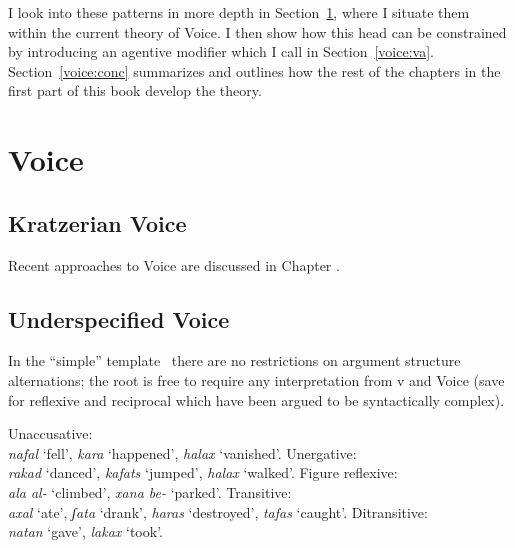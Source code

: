 I look into these patterns in more depth in Section~\ref{voice:voice}, where I situate them within the current theory of Voice. I then show how this head can be constrained by introducing an agentive modifier which I call {\va} in Section~\ref{voice:va}. Section~\ref{voice:conc} summarizes and outlines how the rest of the chapters in the first part of this book develop the theory.

\section{Voice} \label{voice:voice}
	\subsection{Kratzerian Voice}
	
	
Recent approaches to Voice are discussed in Chapter \label{chap:aas}.

	\subsection{Underspecified Voice}


In the ``simple'' template \tkal~there are no restrictions on argument structure alternations; the root is free to require any interpretation from v and Voice (save for reflexive and reciprocal which have been argued to be syntactically complex).

    \begin{minipage}[t]{0.5\textwidth}
    \pex
        \a Unaccusative:\\ \emph{nafal} `fell', \emph{kara} `happened', \emph{halax} `vanished'.
        \a Unergative:\\ \emph{rakad} `danced', \emph{kafats} `jumped', \emph{halax} `walked'.
        \a Figure reflexive:\\ \emph{ala al-} `climbed', \emph{xana be-} `parked'.
        \a Transitive:\\ \emph{axal} `ate', \emph{ʃata} `drank', \emph{haras} `destroyed', \emph{tafas} `caught'.
        \a Ditransitive:\\ \emph{natan} `gave', \emph{lakax} `took'.
    \xe
\end{minipage}
\begin{minipage}[t]{0.05\textwidth}
    \phantom{asdfasdf}
\end{minipage}
\begin{minipage}[t]{0.4\textwidth}
    \ex
    \xe
\end{minipage}

